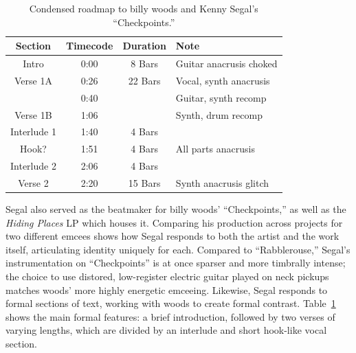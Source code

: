 \begin{table}[ht]
    \centering
    \begin{tabular}{|c|c|c|l|}
        \hline
         Section      & Timecode & Duration & Note                          \\ \hline
         Intro        & 0:00     & 8 Bars   & Guitar anacrusis choked       \\ \hline
         Verse 1A     & 0:26     & 22 Bars  & Vocal, synth  anacrusis       \\ \hline
                      & 0:40     &          & Guitar, synth recomp          \\ \hline
         Verse 1B     & 1:06     &          & Synth, drum recomp            \\ \hline
         Interlude 1  & 1:40     & 4 Bars   &                               \\ \hline
         Hook?        & 1:51     & 4 Bars   & All parts anacrusis           \\ \hline
         Interlude 2  & 2:06     & 4 Bars   &                               \\ \hline
         Verse 2      & 2:20     & 15 Bars  & Synth anacrusis glitch        \\ \hline
         
    \end{tabular}
    \caption{Condensed roadmap to billy woods and Kenny Segal's ``Checkpoints.''}
    \label{tab:checkpoints}
\end{table}

Segal also served as the beatmaker for billy woods' ``Checkpoints,'' as well as the \textit{Hiding Places}
LP which houses it. Comparing his production across projects for two different emcees shows how Segal
responds to both the artist and the work itself, articulating identity uniquely for each. Compared to
``Rabblerouse,'' Segal's instrumentation on ``Checkpoints'' is at once sparser and more timbrally intense;
the choice to use distored, low-register electric guitar played on neck pickups matches woods' more highly
energetic emceeing. Likewise, Segal responds to formal sections of text, working with woods to create
formal contrast. Table~\ref{tab:checkpoints} shows the main formal features: a brief introduction,
followed by two verses of varying lengths, which are divided by an interlude and short hook-like
vocal section.

